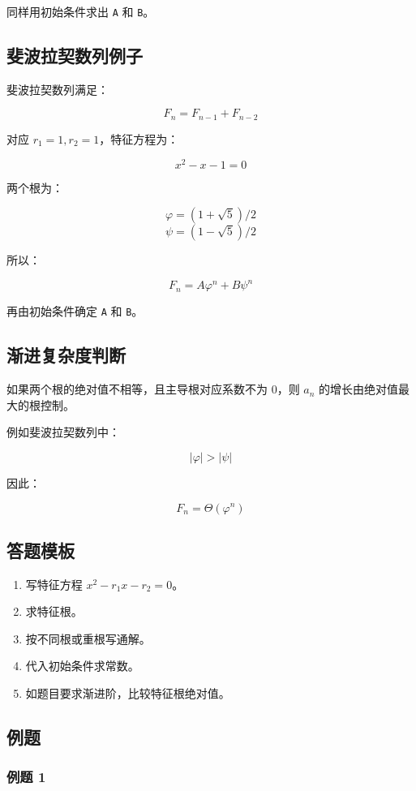 \documentclass[UTF8,zihao=-4]{ctexart}
\begin{document}
同样用初始条件求出 \texttt{A} 和 \texttt{B}。

\subsection*{斐波拉契数列例子}

斐波拉契数列满足：

\[F_{n} = F_{n-1} + F_{n-2}\]

对应 $r_1 = 1, r_2 = 1$，特征方程为：

\[x^{2} - x - 1 = 0\]

两个根为：

\[\varphi = (1 + \sqrt{5}) / 2\]
\[\psi = (1 - \sqrt{5}) / 2\]

所以：

\[F_{n} = A \varphi^{n} + B \psi^{n}\]

再由初始条件确定 \texttt{A} 和 \texttt{B}。

\subsection*{渐进复杂度判断}

如果两个根的绝对值不相等，且主导根对应系数不为 0，则 $a_n$ 的增长由绝对值最大的根控制。

例如斐波拉契数列中：

\[|\varphi| > |\psi|\]

因此：

\[F_{n} = \Theta(\varphi^{n})\]

\subsection*{答题模板}

\begin{enumerate}
\item 写特征方程 $x^2 - r_1 x - r_2 = 0$。
\item 求特征根。
\item 按不同根或重根写通解。
\item 代入初始条件求常数。
\item 如题目要求渐进阶，比较特征根绝对值。
\end{enumerate}

\subsection*{例题}

\subsubsection*{例题 1}
\end{document}

